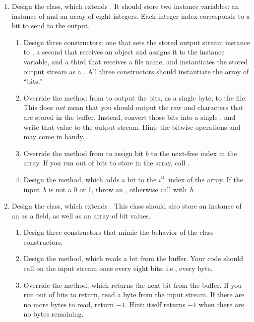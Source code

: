 \begin{enumerate}[label=(\alph*)]
    \item Design the  class, which extends . It should store two instance variables: an instance of  and an array of eight integers. Each integer index corresponds to a bit to send to the output.
    \begin{enumerate}[label=(\roman*)]
        \item Design three  constructors: one that sets the stored output stream instance to , a second that receives an  object and assigns it to the instance variable, and a third that receives a file name, and instantiates the stored output stream as a . All three constructors should instantiate the array of ``bits.''
        \item Override the  method from  to output the bits, as a single byte, to the file. This does \emph{not} mean that you should output the raw  and  characters that are stored in the buffer. Instead, convert those bits into a single , and write that value to the output stream. Hint: the bitwise operations \ttt{<<} and \ttt{|} may come in handy.
        \item Override the  method from  to assign bit $b$ to the next-free index in the array. If you run out of bits to store in the array, call . 
        \item Design the  method, which adds a bit to the $i^\text{th}$ index of the array. If the input~$b$ is not a 0 or 1, throw an , otherwise call  with~$b$.
    \end{enumerate}

    \item Design the  class, which extends . This class should also store an instance of an  as a field, as well as an array of bit values.
    \begin{enumerate}[label=(\roman*)]
        \item Design three  constructors that mimic the behavior of the  class constructors.
        \item Design the  method, which reads a bit from the buffer. Your code should call  on the input stream once every eight bits, i.e., every byte. 
        \item Override the  method, which returns the next bit from the buffer. If you run out of bits to return, read a byte from the input stream. If there are no more bytes to read, return $-1$. Hint:  itself returns $-1$ when there are no bytes remaining.
    \end{enumerate}
\end{enumerate}

